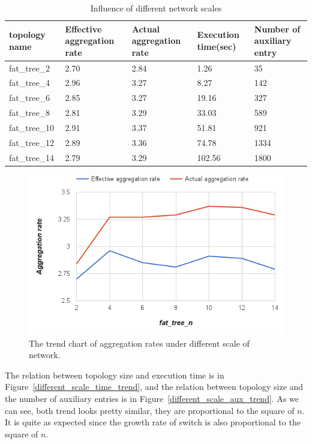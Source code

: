 \begin{table}
\centering
\caption{Influence of different network scales}
\begin{tabular}{|l||l|l|l|l|}
\hline topology name & Effective aggregation rate & Actual aggregation rate & Execution time(sec) & Number of auxiliary entry \\
\hline
\hline fat\_tree\_2 & 2.70 & 2.84 & 1.26 & 35 \\
\hline fat\_tree\_4 & 2.96 & 3.27 & 8.27 & 142 \\
\hline fat\_tree\_6 & 2.85 & 3.27 & 19.16 & 327 \\
\hline fat\_tree\_8 & 2.81 & 3.29 & 33.03 & 589 \\
\hline fat\_tree\_10 & 2.91 & 3.37 & 51.81 & 921 \\
\hline fat\_tree\_12 & 2.89 & 3.36 & 74.78 & 1334 \\
\hline fat\_tree\_14 & 2.79 & 3.29 & 102.56 & 1800 \\
\hline
\end{tabular}
\label{table:different_scale}
\end{table}

\begin{figure}[H]
\begin{center} 
\includegraphics[width=1\textwidth]{figures/exp_scale_rate_trend.png}
\end{center}
\caption{The trend chart of aggregation rates under different scale of network.}
\label{different_scale_rate_trend}
\end{figure}

The relation between topology size and execution time is in Figure~\ref{different_scale_time_trend}, and the relation between topology size and the number of auxiliary entries is in Figure~\ref{different_scale_aux_trend}. As we can see, both trend looks pretty similar, they are proportional to the square of $n$. It is quite as expected since the growth rate of switch is also proportional to the square of $n$.

